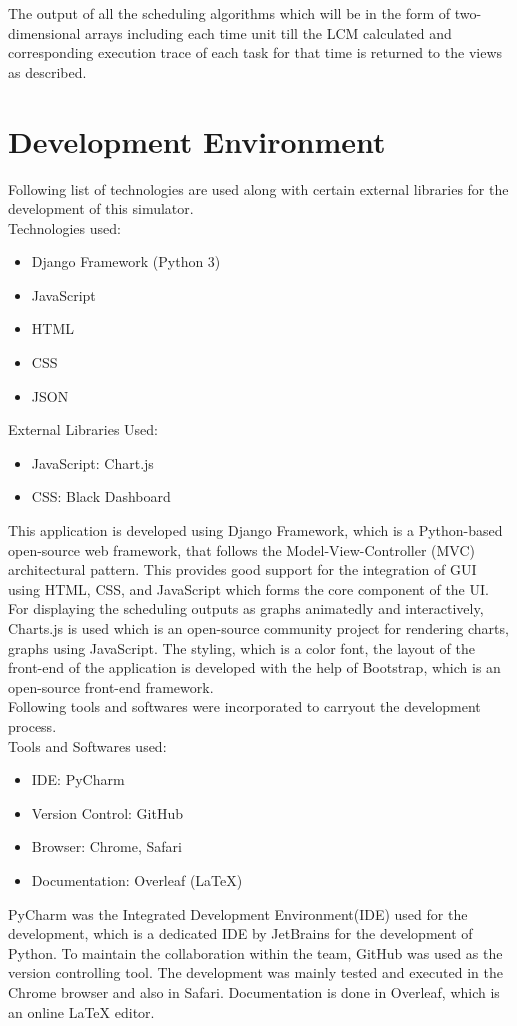 \documentclass[12pt, conference]{IEEEtran}
\begin{document}
The output of all the scheduling algorithms which will be in the form of two-dimensional arrays including each time unit till the LCM calculated and corresponding execution trace of each task for that time is returned to the views as described.


\section{Development Environment}
Following list of technologies are used along with certain external libraries for the development of this simulator.\\
Technologies used:
\begin{itemize}
    \item Django Framework (Python 3)
    \item JavaScript
    \item HTML
    \item CSS
    \item JSON
\end{itemize}
External Libraries Used:
\begin{itemize}
    \item JavaScript: Chart.js \cite{b3}
    \item CSS: Black Dashboard \cite{b4}
\end{itemize}

This application is developed using Django Framework, which is a Python-based open-source web framework, that follows the Model-View-Controller (MVC) architectural pattern. This provides good support for the integration of GUI using HTML, CSS, and JavaScript which forms the core component of the UI. For displaying the scheduling outputs as graphs animatedly and interactively, Charts.js is used which is an open-source community project for rendering charts, graphs using JavaScript.\cite{b3} The styling, which is a color font, the layout of the front-end of the application is developed with the help of Bootstrap, which is an open-source front-end framework. \cite{b4}\\

Following tools and softwares were incorporated to carryout the development process.\\
Tools and Softwares used:
\begin{itemize}
    \item IDE: PyCharm
    \item Version Control: GitHub
    \item Browser: Chrome, Safari
    \item Documentation: Overleaf (LaTeX)
\end{itemize} 
PyCharm was the Integrated Development Environment(IDE) used for the development, which is a dedicated IDE by JetBrains for the development of Python. To maintain the collaboration within the team, GitHub was used as the version controlling tool. The development was mainly tested and executed in the Chrome browser and also in Safari. Documentation is done in Overleaf, which is an online LaTeX editor.\\
\end{document}
